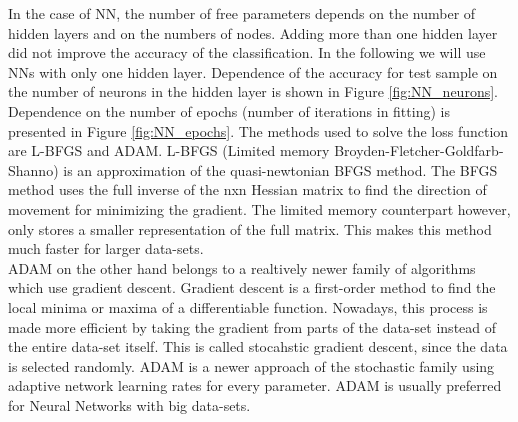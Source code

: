 In the case of NN, the number of free parameters depends on the number of hidden layers and on the numbers of nodes.
Adding more than one hidden layer did not improve the accuracy of the classification.
In the following we will use NNs with only one hidden layer.
Dependence of the accuracy for test sample on the number of neurons in the hidden layer is shown in Figure \ref{fig:NN_neurons}.
Dependence on the number of epochs (number of iterations in fitting) is presented in Figure \ref{fig:NN_epochs}. 
The methods used to solve the loss function are L-BFGS and ADAM. L-BFGS (Limited memory Broyden-Fletcher-Goldfarb-Shanno) is an approximation of the quasi-newtonian BFGS method. The BFGS method uses the full inverse of the nxn Hessian matrix to find the direction of movement for minimizing the gradient. The limited memory counterpart however, only stores a smaller representation of the full matrix. This makes this method much faster for larger data-sets.\\
ADAM on the other hand belongs to a realtively newer family of algorithms which use gradient descent. Gradient descent is a first-order method to find the local minima or maxima of a differentiable function. Nowadays, this process is made more efficient by taking the gradient from parts of the data-set instead of the entire data-set itself. This is called stocahstic gradient descent, since the data is selected randomly. ADAM is a newer approach of the stochastic family using adaptive network learning rates for every parameter. ADAM is usually preferred for Neural Networks with big data-sets.\\ 

